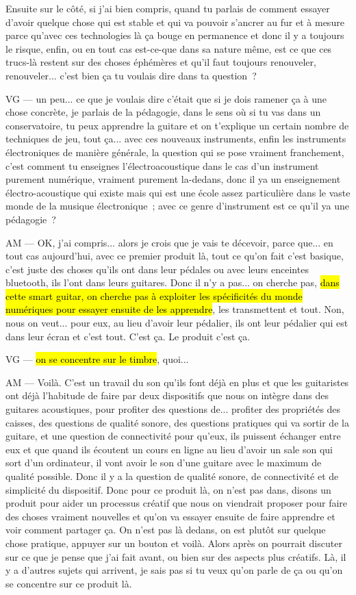Ensuite sur le côté, si j'ai bien compris, quand tu parlais de comment essayer d'avoir quelque chose qui est stable et qui va pouvoir s'ancrer au fur et à mesure parce qu'avec ces technologies là ça bouge en permanence et donc il y a toujours le risque, enfin, ou en tout cas est-ce-que dans sa nature même, est ce que ces trucs-là restent sur des choses éphémères et qu'il faut toujours renouveler, renouveler... c'est bien ça tu voulais dire dans ta question ?

VG —  un peu... ce que je voulais dire c'était que si je dois ramener ça à une chose concrète, je parlais de la pédagogie, dans le sens où si tu vas dans un conservatoire, tu peux apprendre la guitare et on t'explique un certain nombre de techniques de jeu, tout ça... avec ces nouveaux instruments, enfin les instruments électroniques de manière générale, la question qui se pose vraiment franchement, c'est comment tu enseignes l'électroacoustique dans le cas d'un instrument purement numérique, vraiment purement la-dedans, donc il ya un enseignement électro-acoustique qui existe mais qui est une école assez particulière dans le vaste monde de la musique électronique ; avec ce genre d'instrument est ce qu'il ya une pédagogie ?

AM — OK, j'ai compris... alors je crois que je vais te décevoir, parce que... en tout cas aujourd'hui, avec ce premier produit là, tout ce qu'on fait c'est basique, c'est juste des choses qu'ils ont dans leur pédales ou avec leurs enceintes bluetooth, ils l'ont dans leurs guitares. Donc il n'y a pas... on cherche pas, \hl{dans cette smart guitar, on cherche pas à exploiter les spécificités du monde numériques pour essayer ensuite de les apprendre}, les transmettent et tout. Non, nous on veut... pour eux, au lieu d'avoir leur pédalier, ils ont leur pédalier qui est dans leur écran et c'est tout. C'est ça. Le produit c'est ça. 

VG — \hl{on se concentre sur le timbre}, quoi... 

AM —  Voilà. C'est un travail du son qu'ils font déjà en plus et que les guitaristes ont déjà l'habitude de faire par deux dispositifs que nous on intègre dans des guitares acoustiques, pour profiter des questions de... profiter des propriétés des caisses, des questions de qualité sonore, des questions pratiques qui va sortir de la guitare, et une question de connectivité pour qu'eux, ils puissent échanger entre eux et que quand ils écoutent un cours en ligne au lieu d'avoir un sale son qui sort d'un ordinateur, il vont avoir le son d'une guitare avec le maximum de qualité possible. Donc il y a la question de qualité sonore, de connectivité et de simplicité du dispositif. Donc pour ce produit là, on n'est pas dans, disons un produit pour aider un processus créatif que nous on viendrait proposer pour faire des choses vraiment nouvelles et qu'on va essayer ensuite de faire apprendre et voir comment partager ça. On n'est pas là dedans, on est plutôt sur quelque chose pratique, appuyer sur un bouton et voilà. Alors après on pourrait discuter sur ce que je pense que j'ai fait avant, ou bien sur des aspects plus créatifs. Là, il y a d'autres sujets qui arrivent, je sais pas si tu veux qu'on parle de ça ou qu'on se concentre sur ce produit là. 

